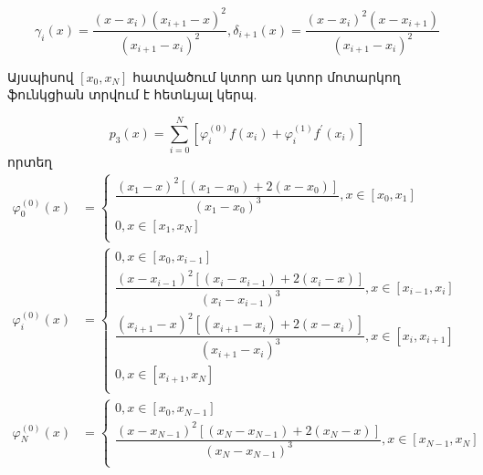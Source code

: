 \documentclass[fleqn, bachelor,subf,12pt,notitlepage]{disser}
\begin{document}
$$\gamma_{i}(x)=\dfrac{\left(x-x_{i}\right)\left(x_{i+1}-x\right)^{2}}{\left(x_{i+1}-x_{i}\right)^{2}}, \delta_{i+1}(x)=\dfrac{\left(x-x_{i}\right)^2\left(x-x_{i+1}\right)}{\left(x_{i+1}-x_{i}\right)^{2}}$$

Այսպիսով $\left[x_{0}, x_{N}\right]$ հատվածում կտոր առ կտոր մոտարկող ֆունկցիան տրվում է հետևյալ կերպ.

$$p_{3}(x)=\sum_{i=0}^{N}\left[\varphi_{i}^{(0)}f(x_{i})+\varphi_{i}^{(1)}f^{'}(x_{i})\right]$$
որտեղ 
\begin{align*}
\varphi^{(0)}_{0}\left(x\right)&=\begin{cases}
\dfrac{\left(x_{1}-x\right)^{2}\left[\left(x_{1}-x_{0}\right)+2\left(x-x_{0}\right)\right]}{\left(x_{1}-x_{0}\right)^{3}},  x\in \left[x_{0}, x_{1}\right]\\
0, x\in \left[x_{1}, x_{N}\right]\\
\end{cases}\\
\varphi^{(0)}_{i}\left(x\right)&=\begin{cases}
0, x\in \left[x_{0}, x_{i-1}\right]\\
\dfrac{\left(x-x_{i-1}\right)^{2}\left[\left(x_{i}-x_{i-1}\right)+2\left(x_{i}-x\right)\right]}{\left(x_{i}-x_{i-1}\right)^{3}}, x\in \left[x_{i-1}, x_{i}\right]\\
\dfrac{\left(x_{i+1}-x\right)^{2}\left[\left(x_{i+1}-x_{i}\right)+2\left(x-x_{i}\right)\right]}{\left(x_{i+1}-x_{i}\right)^{3}}, x\in \left[x_{i}, x_{i+1}\right]\\
0, x\in \left[x_{i+1}, x_{N}\right]\\
\end{cases}\\
\varphi^{(0)}_{N}\left(x\right)&=\begin{cases}
0, x\in \left[x_{0}, x_{N-1}\right]\\
\dfrac{\left(x-x_{N-1}\right)^{2}\left[\left(x_{N}-x_{N-1}\right)+2\left(x_{N}-x\right)\right]}{\left(x_{N}-x_{N-1}\right)^{3}}, x\in \left[x_{N-1}, x_{N}\right]\\
\end{cases}
\end{align*}
\end{document}
